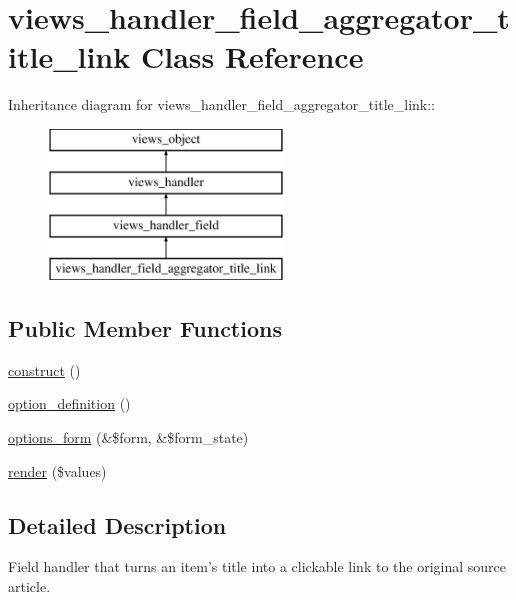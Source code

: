 \hypertarget{classviews__handler__field__aggregator__title__link}{
\section{views\_\-handler\_\-field\_\-aggregator\_\-title\_\-link Class Reference}
\label{classviews__handler__field__aggregator__title__link}
}
Inheritance diagram for views\_\-handler\_\-field\_\-aggregator\_\-title\_\-link::\begin{figure}[H]
\begin{center}
\leavevmode
\includegraphics[height=4cm]{classviews__handler__field__aggregator__title__link}
\end{center}
\end{figure}
\subsection*{Public Member Functions}
\begin{CompactItemize}
\item 
\hyperlink{classviews__handler__field__aggregator__title__link_bcde91e341b70cc842fec304c7de8376}{construct} ()
\item 
\hyperlink{classviews__handler__field__aggregator__title__link_92ccca19cd954e8522c77dd75119d42a}{option\_\-definition} ()
\item 
\hyperlink{classviews__handler__field__aggregator__title__link_6ebe6b2dc8c306fc32258be795f21f3b}{options\_\-form} (\&\$form, \&\$form\_\-state)
\item 
\hyperlink{classviews__handler__field__aggregator__title__link_1b3d319f7a95e1885726a975f1755b9f}{render} (\$values)
\end{CompactItemize}


\subsection{Detailed Description}
Field handler that turns an item's title into a clickable link to the original source article. 

